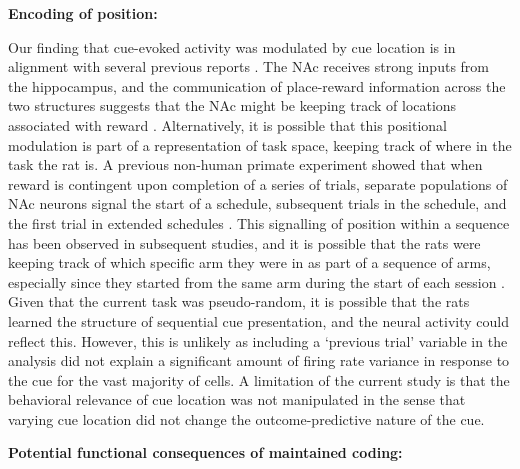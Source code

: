 \documentclass[11pt]{article}
\let\cite=\citep
\begin{document}
{{\bf Encoding of position:}

Our finding that cue-evoked activity was modulated by cue location is in alignment with several previous reports \cite{Lavoie1994,Mulder2005,Strait2016,Wiener2003}. The NAc receives strong inputs from the hippocampus, and the communication of place-reward information across the two structures suggests that the NAc might be keeping track of locations associated with reward \cite{Lansink2008,Lansink2009,Lansink2016,Pennartz2004,Sjulson2017,Tabuchi2000,VanderMeer2011}. Alternatively, it is possible that this positional modulation is part of a representation of task space, keeping track of where in the task the rat is. A previous non-human primate experiment showed that when reward is contingent upon completion of a series of trials, separate populations of NAc neurons signal the start of a schedule, subsequent trials in the schedule, and the first trial in extended schedules \cite{Shidara1998}. This signalling of position within a sequence has been observed in subsequent studies, and it is possible that the rats were keeping track of which specific arm they were in as part of a sequence of arms, especially since they started from the same arm during the start of each session \cite{Atallah2014,Berke2009,Khamassi2008,Lansink2012,Mulder2004}. Given that the current task was pseudo-random, it is possible that the rats learned the structure of sequential cue presentation, and the neural activity could reflect this. However, this is unlikely as including a ‘previous trial’ variable in the analysis did not explain a significant amount of firing rate variance in response to the cue for the vast majority of cells. A limitation of the current study is that the behavioral relevance of cue location was not manipulated in the sense that varying cue location did not change the outcome-predictive nature of the cue. 

{\bf Potential functional consequences of maintained coding:}

}
\end{document}

